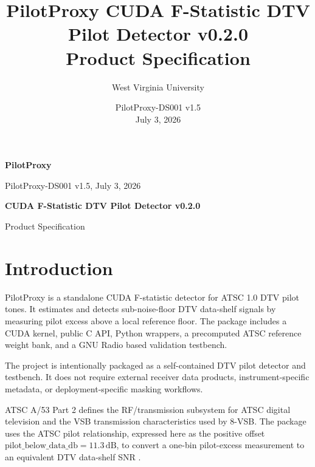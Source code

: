 \documentclass[10pt,letterpaper]{article}
\title{PilotProxy CUDA F-Statistic DTV Pilot Detector v0.2.0\\Product Specification}
\author{West Virginia University}
\date{PilotProxy-DS001 v1.5 \\ July 3, 2026}
\newcommand{\dB}{\,\mathrm{dB}}
\begin{document}
\thispagestyle{fancy}
{\sffamily
\begin{minipage}[t]{0.39\textwidth}
  {\fontsize{24}{26}\selectfont\bfseries\color{FStatRed}PilotProxy}\par
  {\small PilotProxy-DS001 v1.5, July 3, 2026}
\end{minipage}
\hfill
\begin{minipage}[t]{0.58\textwidth}
  \raggedleft
  {\fontsize{18}{20}\selectfont\bfseries CUDA F-Statistic DTV Pilot Detector v0.2.0}\par
  {\small Product Specification}
\end{minipage}
}

\vspace{0.14in}

\begin{minipage}[t]{0.48\textwidth}
\section*{Introduction}
PilotProxy is a standalone CUDA F-statistic detector for ATSC 1.0 DTV pilot tones.  It estimates and detects sub-noise-floor DTV data-shelf signals by measuring pilot excess above a local reference floor.  The package includes a CUDA kernel, public C API, Python wrappers, a precomputed ATSC reference weight bank, and a GNU Radio based validation testbench.

The project is intentionally packaged as a self-contained DTV pilot detector and testbench.  It does not require external receiver data products, instrument-specific metadata, or deployment-specific masking workflows.

ATSC A/53 Part 2 defines the RF/transmission subsystem for ATSC digital television and the VSB transmission characteristics used by 8-VSB.  The package uses the ATSC pilot relationship, expressed here as the positive offset \(\mathrm{pilot\_below\_data\_db}=11.3\dB\), to convert a one-bin pilot-excess measurement to an equivalent DTV data-shelf SNR \cite{atsc_a53_part2_2011}.


\end{minipage}
\end{document}
